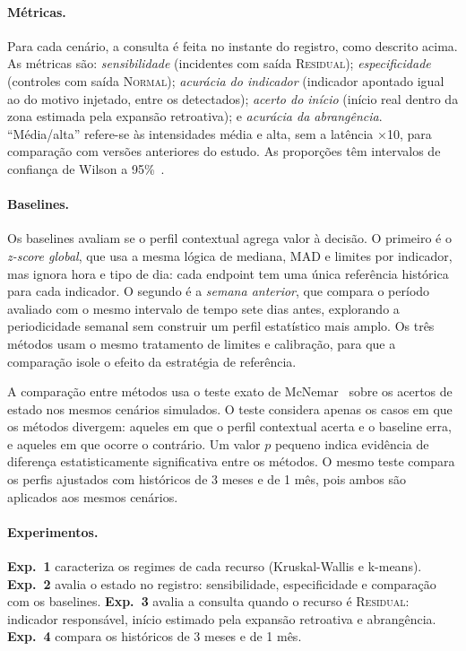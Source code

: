 \documentclass[sigconf,nonacm]{acmart}
\newcommand{\Normal}{\textsc{Normal}\xspace}
\newcommand{\Residual}{\textsc{Residual}\xspace}
\begin{document}
\paragraph{Métricas.} Para cada cenário, a consulta é feita no instante do registro, como descrito acima. As métricas são: \emph{sensibilidade} (incidentes com saída \Residual); \emph{especificidade} (controles com saída \Normal); \emph{acurácia do indicador} (indicador apontado igual ao do motivo injetado, entre os detectados); \emph{acerto do início} (início real dentro da zona estimada pela expansão retroativa); e \emph{acurácia da abrangência}. ``Média/alta'' refere-se às intensidades média e alta, sem a latência $\times$10, para comparação com versões anteriores do estudo. As proporções têm intervalos de confiança de Wilson a 95\%~\citep{wilson1927probable}.

\paragraph{Baselines.} Os baselines avaliam se o perfil contextual agrega valor à decisão. O primeiro é o \emph{z-score global}, que usa a mesma lógica de mediana, MAD e limites por indicador, mas ignora hora e tipo de dia: cada endpoint tem uma única referência histórica para cada indicador. O segundo é a \emph{semana anterior}, que compara o período avaliado com o mesmo intervalo de tempo sete dias antes, explorando a periodicidade semanal sem construir um perfil estatístico mais amplo. Os três métodos usam o mesmo tratamento de limites e calibração, para que a comparação isole o efeito da estratégia de referência.

A comparação entre métodos usa o teste exato de McNemar~\citep{mcnemar1947note} sobre os acertos de estado nos mesmos cenários simulados. O teste considera apenas os casos em que os métodos divergem: aqueles em que o perfil contextual acerta e o baseline erra, e aqueles em que ocorre o contrário. Um valor $p$ pequeno indica evidência de diferença estatisticamente significativa entre os métodos. O mesmo teste compara os perfis ajustados com históricos de 3 meses e de 1 mês, pois ambos são aplicados aos mesmos cenários.

\paragraph{Experimentos.} \textbf{Exp.~1} caracteriza os regimes de cada recurso (Kruskal-Wallis e k-means). \textbf{Exp.~2} avalia o estado no registro: sensibilidade, especificidade e comparação com os baselines. \textbf{Exp.~3} avalia a consulta quando o recurso é \Residual: indicador responsável, início estimado pela expansão retroativa e abrangência. \textbf{Exp.~4} compara os históricos de 3 meses e de 1 mês.
\end{document}
